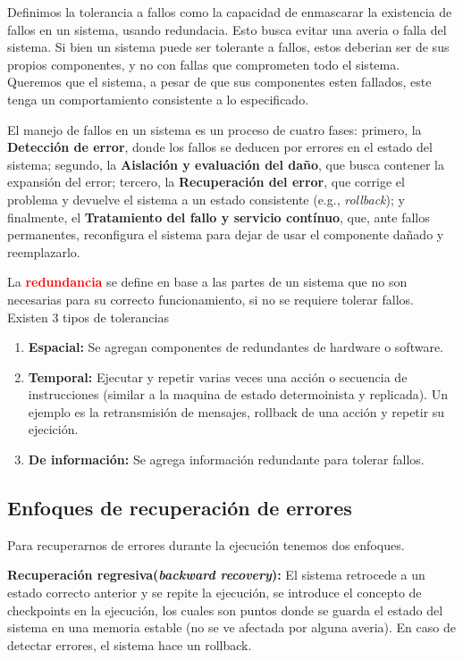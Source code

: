 Definimos la tolerancia a fallos como la capacidad de enmascarar la existencia de fallos en un sistema, usando redundacia. Esto busca evitar una averia o falla del sistema. Si bien un sistema puede ser tolerante a fallos, estos deberian ser de sus propios componentes, y no con fallas que comprometen todo el sistema. Queremos que el sistema, a pesar de que sus componentes esten fallados, este tenga un comportamiento consistente a lo especificado.
\vspace{1mm}

El manejo de fallos en un sistema es un proceso de cuatro fases: primero, la \textbf{Detección de error}, donde los fallos se deducen por errores en el estado del sistema; segundo, la \textbf{Aislación y evaluación del daño}, que busca contener la expansión del error; tercero, la \textbf{Recuperación del error}, que corrige el problema y devuelve el sistema a un estado consistente (e.g., \textit{rollback}); y finalmente, el \textbf{Tratamiento del fallo y servicio contínuo}, que, ante fallos permanentes, reconfigura el sistema para dejar de usar el componente dañado y reemplazarlo.

La \textcolor{red}{\textbf{redundancia}} se define en base a las partes de un sistema que no son necesarias para su correcto funcionamiento, si no se requiere tolerar fallos. Existen 3 tipos de tolerancias
\begin{enumerate}
    \item \textbf{Espacial:} Se agregan componentes de redundantes de hardware o software.
    \item \textbf{Temporal:} Ejecutar y repetir varias veces una acción o secuencia de instrucciones (similar a la maquina de estado determoinista y replicada). Un ejemplo es la retransmisión de mensajes, rollback de una acción y repetir su ejecición.
    \item \textbf{De información:} Se agrega información redundante para tolerar fallos.
\end{enumerate} 

\subsection{Enfoques de recuperación de errores}
Para recuperarnos de errores durante la ejecución tenemos dos enfoques.

\textbf{Recuperación regresiva(\textit{backward recovery}):} El sistema retrocede a un estado correcto anterior y se repite la ejecución, se introduce el concepto de checkpoints en la ejecución, los cuales son puntos donde se guarda el estado del sistema en una memoria estable (no se ve afectada por alguna averia). En caso de detectar errores, el sistema hace un rollback.

